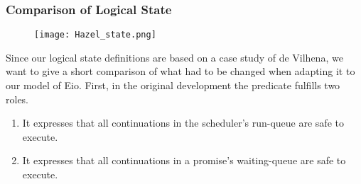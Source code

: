 


\subsubsection{Comparison of Logical State}
\label{sec:sched-spec-state-comparison}

\begin{figure}[ht]
  \texttt{[image: Hazel\_state.png]}
\end{figure}

Since our logical state definitions are based on a case study of de Vilhena, we want to give a short comparison of what had to be changed when adapting it to our model of Eio.
First, in the original development the \gsReady{} predicate fulfills two roles.
\begin{enumerate}
  \item It expresses that all continuations in the scheduler's run-queue are safe to execute.
  \item It expresses that all continuations in a promise's waiting-queue are safe to execute.
\end{enumerate}

